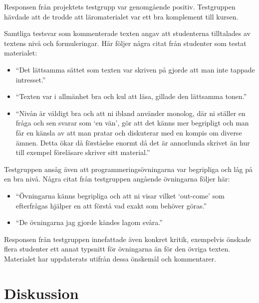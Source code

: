 \documentclass[]{article}
\begin{document}
Responsen från projektets testgrupp var genomgående
positiv. Testgruppen hävdade att de trodde att läromaterialet var ett
bra komplement till kursen.

Samtliga testsvar som kommenterade texten angav att studenterna
tilltalades av textens nivå och formuleringar. Här följer några citat
från studenter som testat materialet:
\begin{itemize}
\item ``Det lättsamma sättet som texten var skriven på gjorde att man
 inte tappade intresset.''
\item ``Texten var i allmänhet bra och kul att läsa, gillade den
 lättsamma tonen.''
\item ``Nivån är väldigt bra och att ni ibland använder monolog, där
 ni ställer en fråga och sen svarar som `en vän', gör att det känns
 mer begripligt och man får en känsla av att man pratar och
 diskuterar med en kompis om diverse ämnen. Detta ökar då förståelse
 enormt då det är annorlunda skrivet än hur till exempel föreläsare
 skriver sitt material.''
\end{itemize}

Testgruppen ansåg även att programmeringsövningarna var begripliga och
låg på en bra nivå. Några citat från testgruppen angående övningarna
följer här:
\begin{itemize}
\item ``Övningarna känns begripliga och att ni visar vilket `out-come'
 som efterfrågas hjälper en att förstå vad exakt som behöver göras.''
\item ``De övningarna jag gjorde kändes lagom svåra.''
\end{itemize}

Responsen från testgruppen innefattade även konkret kritik, exempelvis
önskade flera studenter ett annat typsnitt för övningarna än för den
övriga texten. Materialet har uppdaterats utifrån dessa önskemål och
kommentarer.

\section{Diskussion}

\end{document}
